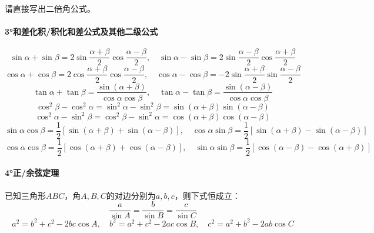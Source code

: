 请直接写出二倍角公式。

\paragraph{3°和差化积/积化和差公式及其他二级公式} \mbox{}
\begin{equation*}
\sin \alpha + \sin \beta = 2 \sin \frac{\alpha + \beta}{2} \cos \frac{\alpha - \beta}{2} , \quad \sin \alpha - \sin \beta = 2 \sin \frac{\alpha - \beta}{2} \cos \frac{\alpha + \beta}{2}
\end{equation*}
\begin{equation*}
\cos \alpha + \cos \beta = 2 \cos \frac{\alpha + \beta}{2} \cos \frac{\alpha - \beta}{2} , \quad \cos \alpha - \cos \beta = -2 \sin \frac{\alpha + \beta}{2} \sin \frac{\alpha - \beta}{2}
\end{equation*}
\begin{equation*}
\tan \alpha + \tan \beta = \frac{\sin \left( \alpha + \beta \right)}{\cos \alpha \cos \beta} , \quad \tan \alpha - \tan \beta = \frac{\sin \left( \alpha - \beta \right)}{\cos \alpha \cos \beta}
\end{equation*}
\begin{equation*}
\cos^{2} \beta - \cos^{2} \alpha = \sin^{2} \alpha - \sin^{2} \beta = \sin \left( \alpha + \beta \right) \sin \left( \alpha - \beta \right)
\end{equation*}
\begin{equation*}
\cos^{2} \alpha - \sin^{2} \beta = \cos^{2} \beta - \sin^{2} \alpha = \cos \left( \alpha + \beta \right) \cos \left( \alpha - \beta \right)
\end{equation*}
\begin{equation*}
\sin \alpha \cos \beta = \frac{1}{2} \left[ \sin \left( \alpha + \beta \right) + \sin \left( \alpha - \beta \right) \right] , \quad \cos \alpha \sin \beta = \frac{1}{2} \left[ \sin \left( \alpha + \beta \right) - \sin \left( \alpha - \beta \right) \right]
\end{equation*}
\begin{equation*}
\cos \alpha \cos \beta = \frac{1}{2} \left[ \cos \left( \alpha + \beta \right) + \cos \left( \alpha - \beta \right) \right] , \quad \sin \alpha \sin \beta = \frac{1}{2} \left[ \cos \left( \alpha - \beta \right) - \cos \left( \alpha + \beta \right) \right]
\end{equation*}

\paragraph{4°正/余弦定理} \mbox{}

已知三角形\(A B C\)，角\(A , B , C\)的对边分别为\(a , b , c\)，则下式恒成立：
\begin{equation*}
\frac{a}{\sin A} = \frac{b}{\sin B} = \frac{c}{\sin C}
\end{equation*}
\begin{equation*}
a^{2} = b^{2} + c^{2} - 2 b c \cos A , \quad b^{2} = a^{2} + c^{2} - 2 a c \cos B , \quad c^{2} = a^{2} + b^{2} - 2 a b \cos C
\end{equation*}
\endgroup
